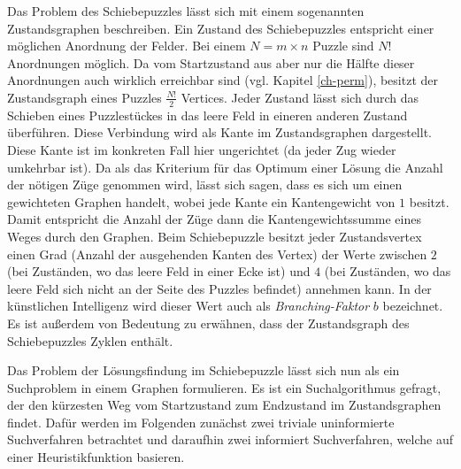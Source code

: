 \documentclass{whswinvcbook}
\begin{document}
Das Problem des Schiebepuzzles lässt sich mit einem sogenannten Zustandsgraphen beschreiben. Ein Zustand des Schiebepuzzles entspricht einer möglichen Anordnung der Felder. Bei einem $N=m\times n$ Puzzle sind $N!$ Anordnungen möglich. Da vom Startzustand aus aber nur die Hälfte dieser Anordnungen auch wirklich erreichbar sind (vgl. Kapitel \ref{ch-perm}), besitzt der Zustandsgraph eines Puzzles $\frac{N!}{2}$ Vertices. Jeder Zustand lässt sich durch das Schieben eines Puzzlestückes in das leere Feld in eineren anderen Zustand überführen. Diese Verbindung wird als Kante im Zustandsgraphen dargestellt. Diese Kante ist im konkreten Fall hier ungerichtet (da jeder Zug wieder umkehrbar ist). Da als das Kriterium für das Optimum einer Lösung die Anzahl der nötigen Züge genommen wird, lässt sich sagen, dass es sich um einen gewichteten Graphen handelt, wobei jede Kante ein Kantengewicht von $1$ besitzt. Damit entspricht die Anzahl der Züge dann die Kantengewichtssumme eines Weges durch den Graphen. Beim Schiebepuzzle besitzt jeder Zustandsvertex einen Grad (Anzahl der ausgehenden Kanten des Vertex) der Werte zwischen $2$ (bei Zuständen, wo das leere Feld in einer Ecke ist) und $4$ (bei Zuständen, wo das leere Feld sich nicht an der Seite des Puzzles befindet) annehmen kann. In der künstlichen Intelligenz wird dieser Wert auch als \textit{Branching-Faktor} $b$ bezeichnet. Es ist außerdem von Bedeutung zu erwähnen, dass der Zustandsgraph des Schiebepuzzles Zyklen enthält.

Das Problem der Lösungsfindung im Schiebepuzzle lässt sich nun als ein Suchproblem in einem Graphen formulieren. Es ist ein Suchalgorithmus gefragt, der den kürzesten Weg vom Startzustand zum Endzustand im Zustandsgraphen findet. Dafür werden im Folgenden zunächst zwei triviale uninformierte Suchverfahren betrachtet und daraufhin zwei informiert Suchverfahren, welche auf einer Heuristikfunktion basieren.
\end{document}

